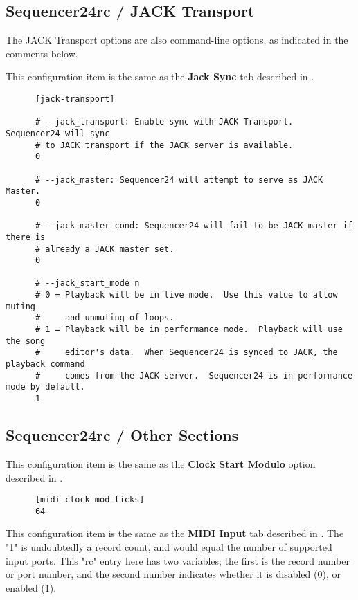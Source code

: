 \subsection{Sequencer24rc / JACK Transport}
\label{subsec:seq24_rc_file_jack_transport}

   The JACK Transport options are also command-line options, as indicated in
   the comments below.

   This configuration item is the same as the 
   \textbf{Jack Sync} tab described in
   .

   \begin{verbatim}
      [jack-transport]

      # --jack_transport: Enable sync with JACK Transport.  Sequencer24 will sync
      # to JACK transport if the JACK server is available.
      0

      # --jack_master: Sequencer24 will attempt to serve as JACK Master.
      0

      # --jack_master_cond: Sequencer24 will fail to be JACK master if there is
      # already a JACK master set.
      0

      # --jack_start_mode n
      # 0 = Playback will be in live mode.  Use this value to allow muting
      #     and unmuting of loops.
      # 1 = Playback will be in performance mode.  Playback will use the song
      #     editor's data.  When Sequencer24 is synced to JACK, the playback command
      #     comes from the JACK server.  Sequencer24 is in performance mode by default.
      1
   \end{verbatim}

\subsection{Sequencer24rc / Other Sections}
\label{subsec:seq24_rc_file_other_midi}

   This configuration item is the same as the
   \textbf{Clock Start Modulo} option described in
   .

   \begin{verbatim}
      [midi-clock-mod-ticks]
      64
   \end{verbatim}

   This configuration item is the same as the 
   \textbf{MIDI Input} tab described in
   .
   The "1" is undoubtedly a record count, and would equal the number of
   supported input ports.
   This "rc" entry here has two variables; the first is the record number or
   port number, and the second number indicates whether it is disabled (0),
   or enabled (1).

